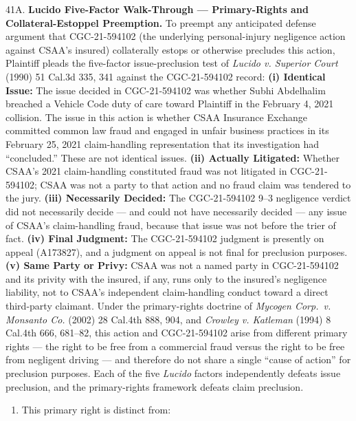 41A. \textbf{Lucido Five-Factor Walk-Through --- Primary-Rights and Collateral-Estoppel Preemption.} To preempt any anticipated defense argument that CGC-21-594102 (the underlying personal-injury negligence action against CSAA's insured) collaterally estops or otherwise precludes this action, Plaintiff pleads the five-factor issue-preclusion test of \emph{Lucido v. Superior Court} (1990) 51 Cal.3d 335, 341 against the CGC-21-594102 record: \textbf{(i) Identical Issue:} The issue decided in CGC-21-594102 was whether Subhi Abdelhalim breached a Vehicle Code duty of care toward Plaintiff in the February 4, 2021 collision. The issue in this action is whether CSAA Insurance Exchange committed common law fraud and engaged in unfair business practices in its February 25, 2021 claim-handling representation that its investigation had ``concluded.'' These are not identical issues. \textbf{(ii) Actually Litigated:} Whether CSAA's 2021 claim-handling constituted fraud was not litigated in CGC-21-594102; CSAA was not a party to that action and no fraud claim was tendered to the jury. \textbf{(iii) Necessarily Decided:} The CGC-21-594102 9--3 negligence verdict did not necessarily decide --- and could not have necessarily decided --- any issue of CSAA's claim-handling fraud, because that issue was not before the trier of fact. \textbf{(iv) Final Judgment:} The CGC-21-594102 judgment is presently on appeal (A173827), and a judgment on appeal is not final for preclusion purposes. \textbf{(v) Same Party or Privy:} CSAA was not a named party in CGC-21-594102 and its privity with the insured, if any, runs only to the insured's negligence liability, not to CSAA's independent claim-handling conduct toward a direct third-party claimant. Under the primary-rights doctrine of \emph{Mycogen Corp.~v. Monsanto Co.} (2002) 28 Cal.4th 888, 904, and \emph{Crowley v. Katleman} (1994) 8 Cal.4th 666, 681--82, this action and CGC-21-594102 arise from different primary rights --- the right to be free from a commercial fraud versus the right to be free from negligent driving --- and therefore do not share a single ``cause of action'' for preclusion purposes. Each of the five \emph{Lucido} factors independently defeats issue preclusion, and the primary-rights framework defeats claim preclusion.

\begin{enumerate}
\def\labelenumi{\arabic{enumi}.}
\setcounter{enumi}{41}
\tightlist
\item
  This primary right is distinct from:
\end{enumerate}

